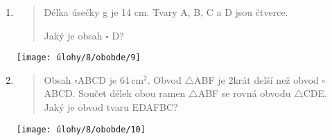 \begin{enumerate}
\begin{minipage}[t]{\linewidth}
    \end{minipage}

    \item
    \begin{minipage}[t]{\linewidth}
        \begin{quote}
            Délka úsečky g je 14 cm. Tvary A, B, C a D jsou čtverce.

            Jaký je obsah $\square$ D?
        \end{quote}
        \centering
        \texttt{[image: úlohy/8/obobde/9]}

    \end{minipage}

    \item
    \begin{minipage}[t]{\linewidth}
        \begin{quote}
            Obsah $\square$ABCD je $64\,\text{cm}^{2}$.
            Obvod $\triangle$ABF je 2krát delší než obvod $\square$ABCD. Součet délek obou ramen $\triangle$ABF se rovná obvodu $\triangle$CDE. Jaký je obvod tvaru EDAFBC?
        \end{quote}
        \centering
        \texttt{[image: úlohy/8/obobde/10]}

    \end{minipage}
\end{enumerate}


\newpage

